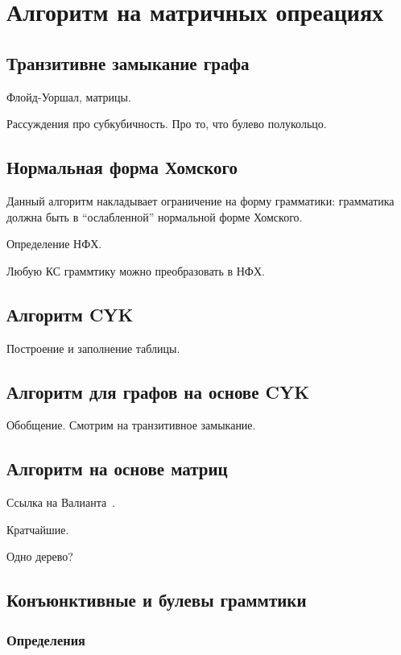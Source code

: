 \section{Алгоритм на матричных опреациях}


\subsection{Транзитивне замыкание графа}

Флойд-Уоршал, матрицы.

Рассуждения про субкубичность.
Про то, что булево полукольцо.

\subsection{Нормальная форма Хомского}

Данный алгоритм накладывает ограничение на форму грамматики: грамматика должна быть в ``ослабленной'' нормальной форме Хомского.

Определение НФХ.

Любую КС граммтику можно преобразовать в НФХ.

\subsection{Алгоритм CYK}

Построение и заполнение таблицы.

\subsection{Алгоритм для графов на основе CYK}

Обобщение. 
Смотрим на транзитивное замыкание.

\subsection{Алгоритм на основе матриц}

Ссылка на Валианта~\cite{!!!}.

Кратчайшие.

Одно дерево?

\subsection{Конъюнктивные и булевы граммтики}

\subsubsection{Определения}

